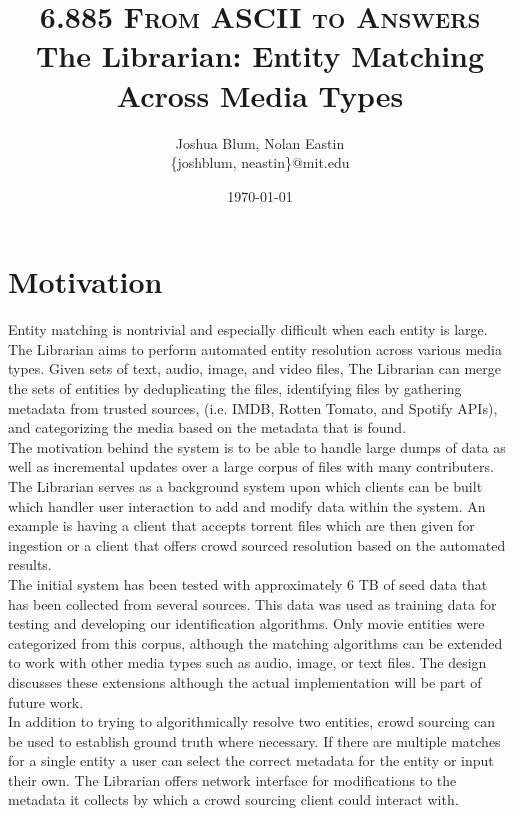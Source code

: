 \documentclass[paper=a4, fontsize=11pt]{scrartcl} %
\title{ 
\normalfont \normalsize 
\textsc{6.885 From ASCII to Answers} %
\horrule{0.5pt} %
\large The Librarian: Entity Matching Across Media Types %
\horrule{1pt} %
}
\author{Joshua Blum, Nolan Eastin \\ \{joshblum, neastin\}@mit.edu}
\date{\normalsize\today} %
\numberwithin{equation}{section} %
\numberwithin{figure}{section} %
\numberwithin{table}{section} %
\begin{document}
\maketitle %

\section{Motivation}
Entity matching is nontrivial and especially difficult when each entity is large. The Librarian aims to perform automated entity resolution across various media types. Given sets of text, audio, image, and video files, The Librarian can merge the sets of entities by deduplicating the files, identifying files by gathering metadata from trusted sources, (i.e. IMDB, Rotten Tomato, and Spotify APIs), and categorizing the media based on the metadata that is found. \\

The motivation behind the system is to be able to handle large dumps of data as well as incremental updates over a large corpus of files with many contributers. The Librarian serves as a background system upon which clients can be built which handler user interaction to add and modify data within the system. An example is having a client that accepts torrent files which are then given for ingestion or a client that offers crowd sourced resolution based on the automated results.\\

The initial system has been tested with approximately 6 TB of seed data that has been collected from several sources. This data was used as training data for testing and developing our identification algorithms. Only movie entities were categorized from this corpus, although the matching algorithms can be extended to work with other media types such as audio, image, or text files. The design discusses these extensions although the actual implementation will be part of future work.\\

In addition to trying to algorithmically resolve two entities, crowd sourcing can be used to establish ground truth where necessary. If there are multiple matches for a single entity a user can select the correct metadata for the entity or input their own. The Librarian offers network interface for modifications to the metadata it collects by which a crowd sourcing client could interact with.\\
\end{document}

